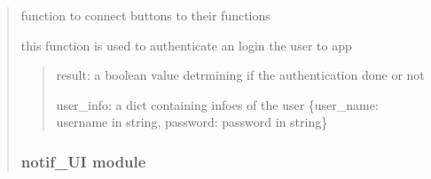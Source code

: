 \documentclass[letterpaper,10pt,english]{sphinxmanual}
\begin{document}
\begin{quote}
\begin{savenotes}
\begin{fulllineitems}
\begin{quote}
\begin{description}
\end{description}\end{quote}

\begin{savenotes}\begin{fulllineitems}
\label{\detokenize{setting/login_api:oxin.login_api.API.button_connector}}
\pysigstartsignatures
{}
\pysigstopsignatures
\sphinxAtStartPar
function to connect buttons to their functions

\end{fulllineitems}\end{savenotes}


\begin{savenotes}\begin{fulllineitems}
\label{\detokenize{setting/login_api:oxin.login_api.API.login}}
\pysigstartsignatures
{}
\pysigstopsignatures
\sphinxAtStartPar
this function is used to authenticate an login the user to app
\begin{quote}\begin{description}
\sphinxAtStartPar
result: a boolean value detrmining if the authentication done or not

\sphinxAtStartPar
user\_info: a dict containing infoes of the user
\{user\_name: username in string, password: password in string\}

\end{description}\end{quote}

\end{fulllineitems}\end{savenotes}


\end{fulllineitems}\end{savenotes}


\sphinxstepscope


\subsubsection{notif\_UI module}
\label{\detokenize{setting/notif_UI:module-oxin.notif_UI}}\label{\detokenize{setting/notif_UI:notif-ui-module}}\label{\detokenize{setting/notif_UI::doc}}


\end{quote}
\end{document}
